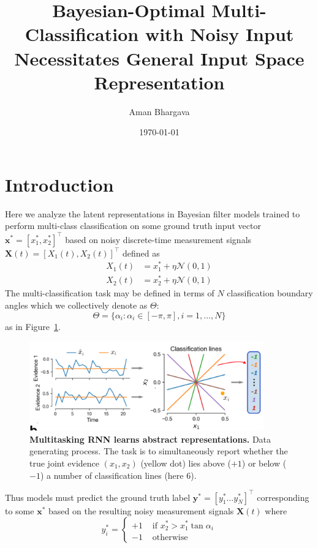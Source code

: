 \documentclass[12pt]{article}
\begin{document}
\title{Bayesian-Optimal Multi-Classification with Noisy Input Necessitates
General Input Space Representation}

\author{Aman Bhargava}

\date{\today}
\maketitle

\section{Introduction}
Here we analyze the latent representations in Bayesian filter models trained to
perform multi-class classification on some ground truth input vector 
$\mathbf x^* = [x_1^*, x_2^*]^\top$ 
based on noisy discrete-time measurement signals
$\mathbf X(t) = [X_1(t), X_2(t)]^\top$ defined as  
\begin{align}
	\label{eqn:def_noisy_input}
	X_1(t) &= x_1^* + \eta \mathcal N(0, 1) \\
	X_2(t) &= x_2^* + \eta \mathcal N(0, 1) 
\end{align}
The multi-classification task may be defined in terms of $N$ classification
boundary angles which we collectively denote as $\Theta$: 
\begin{equation}
	\label{eqn:boundaries}
	\Theta = \{\alpha_i : \alpha_i \in [-\pi, \pi], i = 1, \dots, N\}
\end{equation}
as in Figure~\ref{fig:2a}. 
\begin{figure}[h! tbp]
	\centering 
	\includegraphics[width=0.9\textwidth]{media/multitask_fig2a.png}
	\caption[Multitasking RNN learns abstract representations]{\textbf{Multitasking RNN learns abstract representations. } Data generating process. The task is to simultaneously report whether the true joint evidence $(x_1,x_2)$ (yellow dot) lies above ($+1$) or below ($-1$) a number of classification lines (here 6).}
	\label{fig:2a}
\end{figure}
Thus models must predict the ground truth label 
$\mathbf y^* = [y_1^* \dots y_N^*]^\top$ 
corresponding to some $\mathbf x^*$ based on the resulting noisy measurement
signals $\mathbf X(t)$ where 
\begin{equation}
	\label{eqn:def_multiclass_output}
	y_i^* = \begin{cases}
		+1 & \text{ if $x_2^* > x_1^* \tan \alpha_i$} \\
		-1 & \text{ otherwise }
	\end{cases}
\end{equation}
\end{document}
